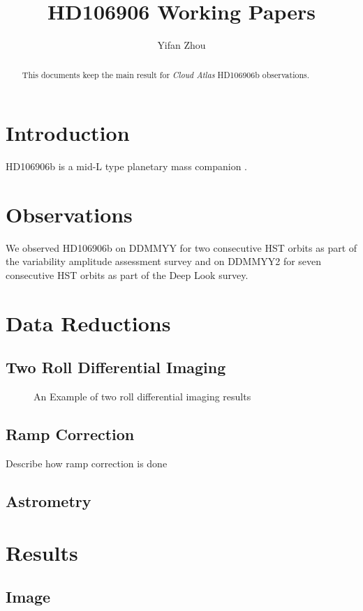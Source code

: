 \documentclass[modern]{aastex62}
\begin{document}
\title{HD106906 Working Papers}


\author{Yifan Zhou}

\begin{abstract}
  This documents keep the main result for \emph{Cloud Atlas} HD106906b \citep{Bailey2013} observations.
\end{abstract}

\keywords{}

\section{Introduction}
HD106906b is a mid-L type planetary mass companion \citep{Bailey2013}.

\section{Observations}
We observed HD106906b on DDMMYY for two consecutive HST orbits as part of the variability amplitude assessment survey and on DDMMYY2 for seven consecutive HST orbits as part of the Deep Look survey. 

\section{Data Reductions}
\subsection{Two Roll Differential Imaging}
\begin{figure}
  \centering
  \caption{An Example of two roll differential imaging results}
  \label{fig:2rdi}
\end{figure}
\subsection{Ramp Correction}
Describe how ramp correction is done
\subsection{Astrometry}

\section{Results}
\subsection{Image}
\end{document}
